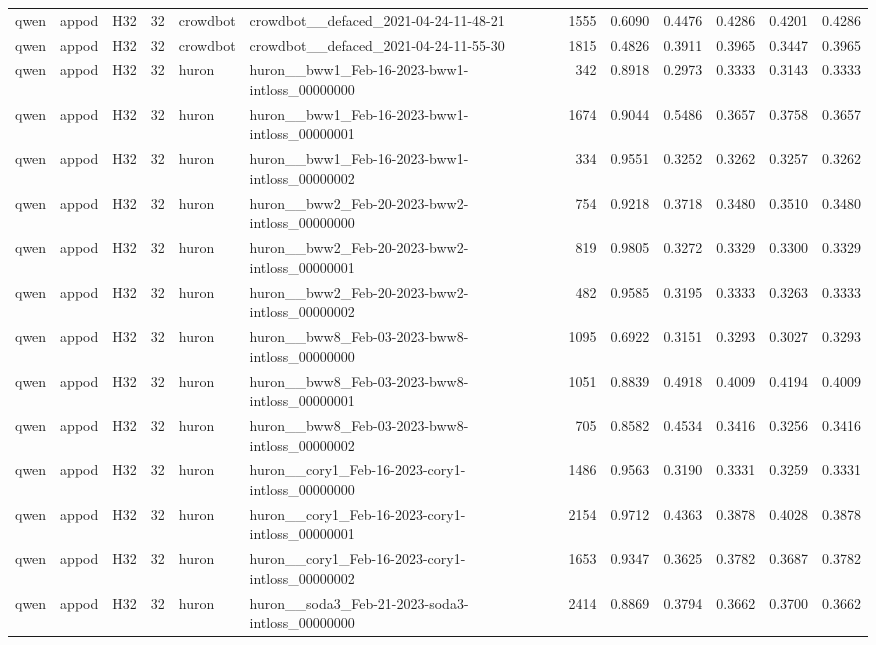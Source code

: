 \begin{table}[tbp]
\begin{tabular}{lllrllrrrrrr}
qwen & appod & H32 & 32 & crowdbot & crowdbot\_\_defaced\_2021-04-24-11-48-21 & 1555 & 0.6090 & 0.4476 & 0.4286 & 0.4201 & 0.4286 \\
qwen & appod & H32 & 32 & crowdbot & crowdbot\_\_defaced\_2021-04-24-11-55-30 & 1815 & 0.4826 & 0.3911 & 0.3965 & 0.3447 & 0.3965 \\
qwen & appod & H32 & 32 & huron & huron\_\_bww1\_Feb-16-2023-bww1-intloss\_00000000 & 342 & 0.8918 & 0.2973 & 0.3333 & 0.3143 & 0.3333 \\
qwen & appod & H32 & 32 & huron & huron\_\_bww1\_Feb-16-2023-bww1-intloss\_00000001 & 1674 & 0.9044 & 0.5486 & 0.3657 & 0.3758 & 0.3657 \\
qwen & appod & H32 & 32 & huron & huron\_\_bww1\_Feb-16-2023-bww1-intloss\_00000002 & 334 & 0.9551 & 0.3252 & 0.3262 & 0.3257 & 0.3262 \\
qwen & appod & H32 & 32 & huron & huron\_\_bww2\_Feb-20-2023-bww2-intloss\_00000000 & 754 & 0.9218 & 0.3718 & 0.3480 & 0.3510 & 0.3480 \\
qwen & appod & H32 & 32 & huron & huron\_\_bww2\_Feb-20-2023-bww2-intloss\_00000001 & 819 & 0.9805 & 0.3272 & 0.3329 & 0.3300 & 0.3329 \\
qwen & appod & H32 & 32 & huron & huron\_\_bww2\_Feb-20-2023-bww2-intloss\_00000002 & 482 & 0.9585 & 0.3195 & 0.3333 & 0.3263 & 0.3333 \\
qwen & appod & H32 & 32 & huron & huron\_\_bww8\_Feb-03-2023-bww8-intloss\_00000000 & 1095 & 0.6922 & 0.3151 & 0.3293 & 0.3027 & 0.3293 \\
qwen & appod & H32 & 32 & huron & huron\_\_bww8\_Feb-03-2023-bww8-intloss\_00000001 & 1051 & 0.8839 & 0.4918 & 0.4009 & 0.4194 & 0.4009 \\
qwen & appod & H32 & 32 & huron & huron\_\_bww8\_Feb-03-2023-bww8-intloss\_00000002 & 705 & 0.8582 & 0.4534 & 0.3416 & 0.3256 & 0.3416 \\
qwen & appod & H32 & 32 & huron & huron\_\_cory1\_Feb-16-2023-cory1-intloss\_00000000 & 1486 & 0.9563 & 0.3190 & 0.3331 & 0.3259 & 0.3331 \\
qwen & appod & H32 & 32 & huron & huron\_\_cory1\_Feb-16-2023-cory1-intloss\_00000001 & 2154 & 0.9712 & 0.4363 & 0.3878 & 0.4028 & 0.3878 \\
qwen & appod & H32 & 32 & huron & huron\_\_cory1\_Feb-16-2023-cory1-intloss\_00000002 & 1653 & 0.9347 & 0.3625 & 0.3782 & 0.3687 & 0.3782 \\
qwen & appod & H32 & 32 & huron & huron\_\_soda3\_Feb-21-2023-soda3-intloss\_00000000 & 2414 & 0.8869 & 0.3794 & 0.3662 & 0.3700 & 0.3662 \\

\end{tabular}
\end{table}
